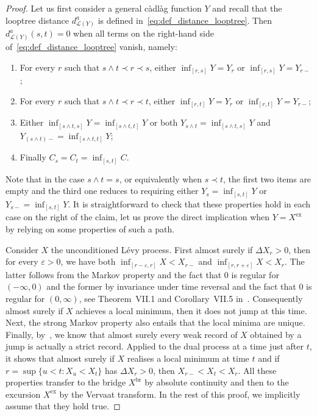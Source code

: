 \documentclass[british, a4paper,11pt]{article}
\numberwithin{equation}{section}
\theoremstyle{definition}
\newcommand{\Loop}{\mathscr{L}}
\newcommand{\exc}{\mathrm{ex}}
\newcommand{\br}{\mathrm{br}}
\begin{document}
\begin{proof}
Let us first consider a general c\`adl\`ag function $Y$ and recall that the looptree distance $d^a_{\Loop(Y)}$ is defined in~\eqref{eq:def_distance_looptree}. Then $d^a_{\Loop(Y)}(s,t) = 0$ when all terms on the right-hand side of~\eqref{eq:def_distance_looptree} vanish, namely:
\begin{enumerate}
\item For every $r$ such that $s \wedge t \prec r \prec s$, either $\inf_{[r,s]} Y = Y_r$ or $\inf_{[r,s]} Y = Y_{r-}$;
\item For every $r$ such that $s \wedge t \prec r \prec t$, either $\inf_{[r,t]} Y = Y_r$ or $\inf_{[r,t]} Y = Y_{r-}$;
\item Either $\inf_{[s \wedge t, s]} Y = \inf_{[s \wedge t, t]} Y$ or both $Y_{s \wedge t} = \inf_{[s \wedge t, s]} Y$ and $Y_{(s \wedge t)-} = \inf_{[s \wedge t, t]} Y$;
\item Finally $C_s = C_t = \inf_{[s,t]} C$.
\end{enumerate}
Note that in the case $s\wedge t = s$, or equivalently when $s \prec t$, the first two items are empty and the third one reduces to requiring either $Y_s = \inf_{[s, t]} Y$ or $Y_{s-} = \inf_{[s, t]} Y$.
It is straightforward to check that these properties hold in each case on the right of the claim, let us prove the direct implication when $Y = X^{\exc}$ by relying on some properties of such a path.

Consider $X$ the unconditioned L\'evy process.
First almost surely if $\Delta X_r > 0$, then for every $\varepsilon>0$, we have both $\inf_{[r-\varepsilon, r]} X < X_{r-}$ and $\inf_{[r, r+\varepsilon]} X < X_{r}$. The latter follows from the Markov property and the fact that $0$ is regular for $(-\infty, 0)$ and the former by invariance under time reversal and the fact that $0$ is regular for $(0,\infty)$, see Theorem~VII.1 and Corollary~VII.5 in~\cite{Ber96}.
Consequently almost surely if $X$ achieves a local minimum, then it does not jump at this time.
Next, the strong Markov property also entails that the local minima are unique.
Finally, by~\cite[Proposition~III.2]{Ber96}, we know that almost surely every weak record of $X$ obtained by a jump is actually a strict record. Applied to the dual process at a time just after $t$, it shows that almost surely if $X$ realises a local minimum at time $t$ and if $r = \sup\{u < t \colon X_u < X_t\}$ has $\Delta X_r > 0$, then $X_{r-} < X_t < X_r$.
All these properties transfer to the bridge $X^{\br}$ by absolute continuity and then to the excursion $X^{\exc}$ by the Vervaat transform.
In the rest of this proof, we implicitly assume that they hold true.


\end{proof}
\end{document}
